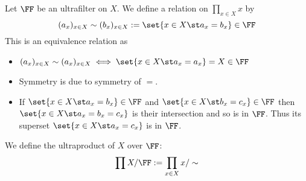 \begin{dfn}[Ultraproduct]
    Let $\FF$ be an ultrafilter on $X$.
    We define a relation on $\prod_{x \in X} x$ by 
    \[
        (a_x)_{x \in X} \sim (b_x)_{x \in X} 
        := \set{x \in X \st a_x = b_x} \in \FF
    \]
    This is an equivalence relation as 
    \begin{itemize}
        \item $(a_x)_{x \in X} \sim (a_x)_{x \in X} \iff 
            \set{x \in X \st a_x = a_x} = X \in \FF$ 
        \item Symmetry is due to symmetry of $=$.
        \item If $\set{x \in X \st a_x = b_x} \in \FF$ and 
            $\set{x \in X \st b_x = c_x} \in \FF$ then 
            $\set{x \in X \st a_x = b_x = c_x}$ is their intersection
            and so is in $\FF$.
            Thus its superset $\set{x \in X \st a_x = c_x}$ is in $\FF$.
    \end{itemize}
    We define the ultraproduct of $X$ over $\FF$:
    \[\prod X / \FF := \prod_{x \in X} x / \sim\]
\end{dfn}

%    
%
%

